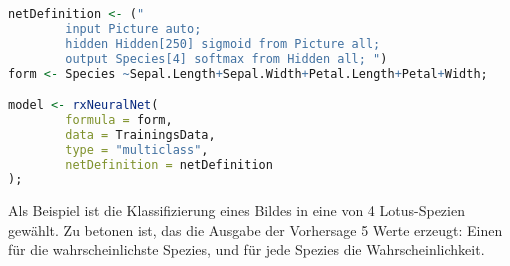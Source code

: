 \begin{lstlisting}[language=R]
netDefinition <- ("
		input Picture auto;
		hidden Hidden[250] sigmoid from Picture all;
		output Species[4] softmax from Hidden all; ")
form <- Species ~Sepal.Length+Sepal.Width+Petal.Length+Petal+Width;

model <- rxNeuralNet(
		formula = form, 
		data = TrainingsData,              
		type = "multiclass",
		netDefinition = netDefinition
);
\end{lstlisting}

Als Beispiel ist die Klassifizierung eines Bildes in eine von 4 Lotus-Spezien gewählt. Zu betonen ist, das die Ausgabe der Vorhersage 5 Werte erzeugt: Einen für die wahrscheinlichste Spezies, und für jede Spezies die Wahrscheinlichkeit.